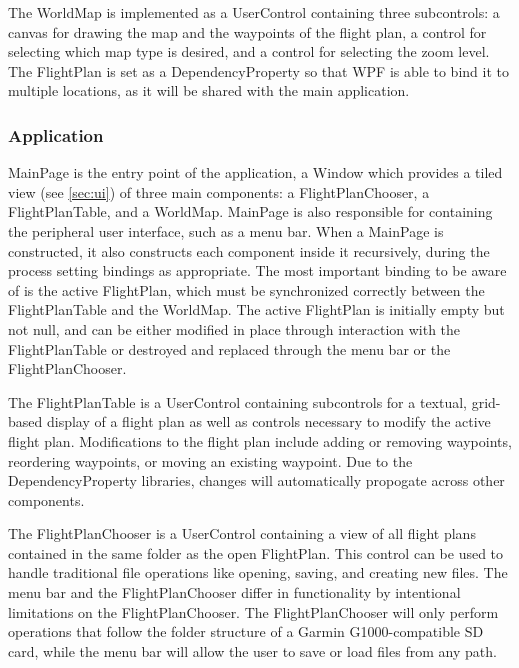 \documentclass[12pt, letterpaper]{article}
\begin{document}

The WorldMap is implemented as a UserControl containing three subcontrols:
a canvas for drawing the map and the waypoints of the flight plan,
a control for selecting which map type is desired,
and a control for selecting the zoom level.
The FlightPlan is set as a DependencyProperty so that WPF is able to bind it to multiple locations, as it will be shared with the main application.

\subsubsection{Application}
MainPage is the entry point of the application, a Window which provides a tiled view (see \ref{sec:ui}) of three main components:
a FlightPlanChooser, a FlightPlanTable, and a WorldMap.
MainPage is also responsible for containing the peripheral user interface, such as a menu bar.
When a MainPage is constructed, it also constructs each component inside it recursively, during the process setting bindings as appropriate.
The most important binding to be aware of is the active FlightPlan, which must be synchronized correctly between the FlightPlanTable and the WorldMap.
The active FlightPlan is initially empty but not null,
and can be either modified in place through interaction with the FlightPlanTable or destroyed and replaced through the menu bar or the FlightPlanChooser.

The FlightPlanTable is a UserControl containing subcontrols for
  a textual, grid-based display of a flight plan as well
  as controls necessary to modify the active flight plan.
Modifications to the flight plan include adding or removing waypoints, reordering waypoints, or moving an existing waypoint.
Due to the DependencyProperty libraries, changes will automatically propogate across other components.

The FlightPlanChooser is a UserControl containing a view of all flight plans contained in the same folder as the open FlightPlan.
This control can be used to handle traditional file operations like opening, saving, and creating new files.
The menu bar and the FlightPlanChooser differ in functionality by intentional limitations on the FlightPlanChooser.
The FlightPlanChooser will only perform operations that follow the folder structure of a Garmin G1000-compatible SD card,
  while the menu bar will allow the user to save or load files from any path.
\end{document}
